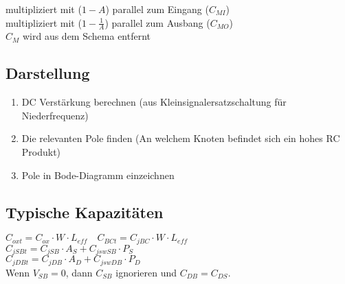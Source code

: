 \begin{multicols}{2}
multipliziert mit ($1-A$) parallel zum Eingang ($C_{MI}$)\\
multipliziert mit ($1-\frac{1}{A}$) parallel zum Ausbang ($C_{MO}$)\\

$C_M$ wird aus dem Schema entfernt\\

\subsection{Darstellung}
\begin{enumerate}
  \item DC Verstärkung berechnen (aus Kleinsignalersatzschaltung für
  Niederfrequenz)
  \item Die relevanten Pole finden (An welchem Knoten befindet sich ein hohes
  RC Produkt)
  \item Pole in Bode-Diagramm einzeichnen
\end{enumerate}

\subsection{Typische Kapazitäten}

$C_{oxt} = C_{ox} \cdot W \cdot L_{eff}  \quad C_{BCt} = C_{jBC} \cdot W \cdot L_{eff} $ \\
$C_{jSBt} = C_{jSB} \cdot A_S + C_{jswSB} \cdot P_S$ \\
$C_{jDBt} = C_{jDB} \cdot A_D + C_{jswDB} \cdot P_D$ \\
Wenn $V_{SB}=0$, dann $C_{SB}$ ignorieren und $C_{DB}=C_{DS}$.

\end{multicols}